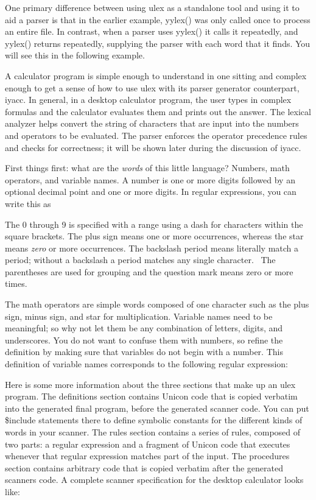 One primary difference between using ulex as a standalone tool and
using it to aid a parser is that in the earlier example,
\textsf{yylex()} was only called once to process an entire file. In
contrast, when a parser uses \textsf{yylex()} it calls it repeatedly,
and \textsf{yylex()} returns repeatedly, supplying the parser with each
word that it finds. You will see this in the following example.

A calculator program is simple enough to understand in one sitting and
complex enough to get a sense of how to use \textsf{ulex} with its
parser generator counterpart, \textsf{iyacc}. In general, in a desktop
calculator program, the user types in complex formulas and the
calculator evaluates them and prints out the answer.  The lexical
analyzer helps convert the string of characters that are input into
the numbers and operators to be evaluated.  The parser enforces the
operator precedence rules and checks for correctness; it will be shown
later during the discussion of iyacc.

First things first: what are the \textit{words} of this little language?
Numbers, math operators, and variable names. A number is one or more
digits followed by an optional decimal point and one or more digits. In
regular expressions, you can write this as


The 0 through 9 is specified with a range using a dash for characters
within the square brackets. The plus sign means one or more
occurrences, whereas the star means \textit{zero} or more occurrences.
The backslash period means literally match a period; without a
backslash a period matches any single character. \ The parentheses are
used for grouping and the question mark means zero or more times.

The math operators are simple {\textquotedbl}words{\textquotedbl}
composed of one character such as the plus sign, minus sign, and star
for multiplication. Variable names need to be meaningful; so why not
let them be any combination of letters, digits, and underscores. You do
not want to confuse them with numbers, so refine the definition by
making sure that variables do not begin with a number. This definition
of variable names corresponds to the following regular expression: 

\iconcode{
[a-zA-Z\_][a-zA-Z0-9\_]*}

Here is some more information about the three sections that make up an
\textsf{ulex} program. The definitions section contains Unicon code
that is copied verbatim into the generated final program, before the
generated scanner code. You can put \textsf{\$include} statements there
to define symbolic constants for the different kinds of words in your
scanner. The rules section contains a series of rules, composed of two
parts: a regular expression and a fragment of Unicon code that executes
whenever that regular expression matches part of the input. The
procedures section contains arbitrary code that is copied verbatim
after the generated scanner{\textquotesingle}s code. A complete scanner
specification for the desktop calculator looks like:

